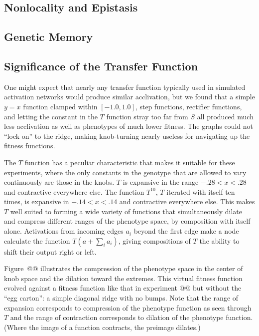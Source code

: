 \documentclass[letterpaper]{article}
\begin{document}
\subsection{Nonlocality and Epistasis}

\subsection{Genetic Memory}

\subsection{Significance of the Transfer Function}

One might expect that nearly any transfer function typically used in simulated
activation networks would produce similar acclivation, but we found that a
simple $y=x$ function clamped within $[-1.0, 1.0]$, step functions, rectifier
functions, and letting the constant in the $T$ function stray too far from $S$
all produced much less acclivation as well as phenotypes of much lower fitness.
The graphs could not ``lock on'' to the ridge, making knob-turning nearly
useless for navigating up the fitness functions.

The $T$ function has a peculiar characteristic that makes it suitable for
these experiments, where the only constants in the genotype that are allowed to
vary continuously are those in the knobs. $T$ is expansive in the range
$-.28 < x < .28$ and contractive everywhere else. The function $T^10$, $T$
iterated with itself ten times, is expansive in $-.14 < x < .14$ and contractive
everywhere else. This makes $T$ well suited to forming a wide variety of
functions that simultaneously dilate and compress different ranges of the
phenotype space, by composition with itself alone. Activations from incoming
edges $a_{i}$ beyond the first edge make a node calculate the function $T(a +
\sum_i a_i)$, giving compositions of $T$ the ability to shift their output
right or left.

Figure~@@ illustrates the compression of the phenotype space in the center of
knob space and the dilation toward the extremes. This virtual fitness function
evolved against a fitness function like that in experiment @@ but without the
``egg carton'': a simple diagonal ridge with no bumps. Note that the range of
expansion corresponds to compression of the phenotype function as seen through
$T$ and the range of contraction corresponds to dilation of the phenotype
function. (Where the image of a function contracts, the preimage dilates.)
\end{document}
